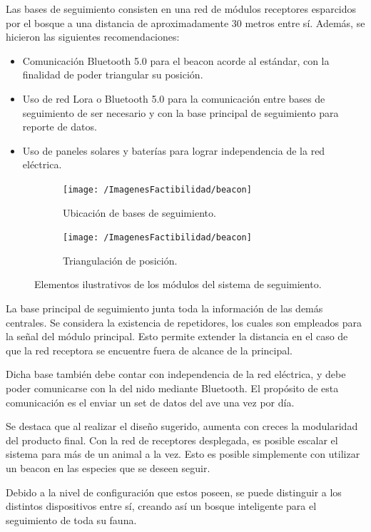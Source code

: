 Las bases de seguimiento consisten en una red de módulos receptores esparcidos por el bosque a una distancia de aproximadamente 30 metros entre sí.
Además, se hicieron las siguientes recomendaciones:
\begin{itemize}
	\item Comunicación Bluetooth 5.0 para el beacon acorde al estándar, con la finalidad de poder triangular su posición.
	\item Uso de red Lora o Bluetooth 5.0 para la comunicación entre bases de seguimiento de ser necesario y con la base principal de seguimiento para reporte de datos.
	\item Uso de paneles solares y baterías para lograr independencia de la red eléctrica.
\end{itemize}
\begin{figure}[H]
\centering
	\begin{subfigure}{0.5\textwidth}
    	\centering
    	\texttt{[image: /ImagenesFactibilidad/beacon]}
  		\caption{Ubicación de bases de seguimiento.}
  		\label{fig:sfig1}
    \end{subfigure}\hfill
    \begin{subfigure}{0.5\textwidth}
    	\centering
    	\texttt{[image: /ImagenesFactibilidad/beacon]}
  		\caption{Triangulación de posición.}
  		\label{fig:sfig2}
    \end{subfigure}
	\caption{Elementos ilustrativos de los módulos del sistema de seguimiento.}
	\label{fig:componentes beacon}
\end{figure}

La base principal de seguimiento junta toda la información de las demás centrales. Se considera la existencia de repetidores, los cuales son empleados para la señal del módulo principal. Esto permite extender la distancia en el caso de que la red receptora se encuentre fuera de alcance de la principal.

Dicha base también debe contar con independencia de la red eléctrica, y debe poder comunicarse con la del nido mediante Bluetooth. El propósito de esta comunicación es el enviar un set de datos del ave una vez por día.

Se destaca que al realizar el diseño sugerido, aumenta con creces la modularidad del producto final. Con la red de receptores desplegada, es posible escalar el sistema para más de un animal a la vez. Esto es posible simplemente con utilizar un beacon en las especies que se deseen seguir. 

Debido a la nivel de configuración que estos poseen, se puede distinguir a los distintos dispositivos entre sí, creando así un bosque inteligente para el seguimiento de toda su fauna.
